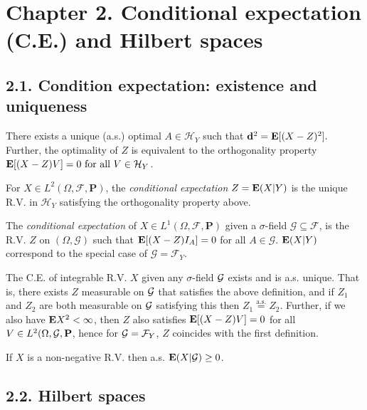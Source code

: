 \section*{Chapter 2. Conditional expectation (C.E.) and Hilbert spaces}
\subsection*{2.1. Condition expectation: existence and uniqueness}
\begin{proposition*}
There exists a unique (a.s.) optimal $A \in \mathcal H_Y$ such that $\mathbf d^2 = \mathbf{E}[(X-Z)^2].$ Further, the optimality of $Z$ is equivalent to the orthogonality property $\mathbf{E}[(X-Z)V] = 0 \text{ for all } V \in \mathcal H_Y$.
\end{proposition*}

\begin{definition*}
For $X \in L^2(\Omega, \mathcal F, \mathbf P)$, the \emph{conditional expectation} $Z = \mathbf{E}(X|Y)$ is the unique R.V. in $\mathcal H_Y$ satisfying the orthogonality property above.
\end{definition*}

\begin{definition*}
The \emph{conditional expectation} of $X \in L^1(\Omega, \mathcal F, \mathbf P)$ given a $\sigma$-field $\mathcal G \subseteq \mathcal F$, is the R.V. $Z$ on $(\Omega, \mathcal G)$ such that $\mathbf{E}[(X-Z)I_A]=0$ for all $A \in \mathcal G$. $\mathbf{E}(X|Y)$ correspond to the special case of $\mathcal G = \mathcal F_Y$.
\end{definition*}

\begin{theorem*}
The C.E. of integrable R.V. $X$ given any $\sigma$-field $\mathcal{G}$ exists and is a.s. unique. That is, there exists $Z$ measurable on $\mathcal{G}$ that satisfies the above definition, and if $Z_1$ and $Z_2$ are both measurable on $\mathcal{G}$ satisfying this then $Z_1 \overset{\text{a.s.}}{=} Z_2$. Further, if we also have $\mathbf{E} X^2 < \infty$, then $Z$ also satisfies $\mathbf{E}[(X-Z)V]=0$ for all $V \in L^2(\Omega, \mathcal{G}, \mathbf P$, hence for $\mathcal{G} = \mathcal F_Y$, $Z$ coincides with the first definition.
\end{theorem*}

\begin{proposition*}
If $X$ is a non-negative R.V. then a.s. $\mathbf{E}(X|\mathcal{G})\geq0$.
\end{proposition*}

\subsection*{2.2. Hilbert spaces}

